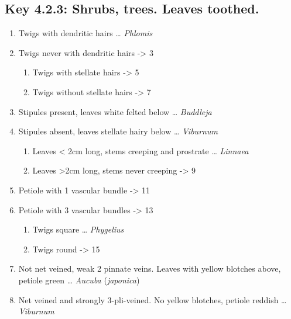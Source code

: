 \documentclass[openany]{book}
\providecommand{\tightlist}{%
  \setlength{\itemsep}{0pt}\setlength{\parskip}{0pt}}
\begin{document}
\hypertarget{key-4.2.3-shrubs-trees.-leaves-toothed.}{%
\subsection{Key 4.2.3: Shrubs, trees. Leaves
toothed.}\label{key-4.2.3-shrubs-trees.-leaves-toothed.}}

\begin{enumerate}
\def\labelenumi{\arabic{enumi}.}
\tightlist
\item
  Twigs with dendritic hairs \ldots{} \emph{Phlomis}
\item
  Twigs never with dendritic hairs -\textgreater{} 3

  \begin{enumerate}
  \def\labelenumii{\arabic{enumii}.}
  \setcounter{enumii}{2}
  \tightlist
  \item
    Twigs with stellate hairs -\textgreater{} 5
  \item
    Twigs without stellate hairs -\textgreater{} 7
  \end{enumerate}
\item
  Stipules present, leaves white felted below \ldots{} \emph{Buddleja}
\item
  Stipules absent, leaves stellate hairy below \ldots{} \emph{Viburnum}

  \begin{enumerate}
  \def\labelenumii{\arabic{enumii}.}
  \setcounter{enumii}{6}
  \tightlist
  \item
    Leaves \textless{} 2cm long, stems creeping and prostrate \ldots{}
    \emph{Linnaea}
  \item
    Leaves \textgreater{}2cm long, stems never creeping -\textgreater{}
    9
  \end{enumerate}
\item
  Petiole with 1 vascular bundle -\textgreater{} 11
\item
  Petiole with 3 vascular bundles -\textgreater{} 13

  \begin{enumerate}
  \def\labelenumii{\arabic{enumii}.}
  \setcounter{enumii}{10}
  \tightlist
  \item
    Twigs square \ldots{} \emph{Phygelius}
  \item
    Twigs round -\textgreater{} 15
  \end{enumerate}
\item
  Not net veined, weak 2 pinnate veins. Leaves with yellow blotches
  above, petiole green \ldots{} \emph{Aucuba} (\emph{japonica})
\item
  Net veined and strongly 3-pli-veined. No yellow blotches, petiole
  reddish \ldots{} \emph{Viburnum}


\end{enumerate}
\end{document}
